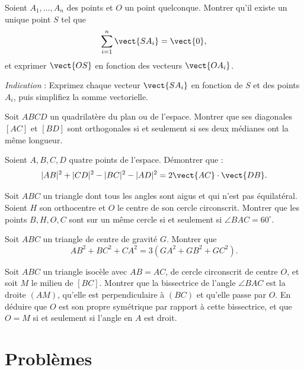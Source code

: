 \begin{exercise}
Soient \( A_1, \ldots, A_n \) des points et \( O \) un point quelconque. Montrer qu'il existe un unique point \( S \) tel que
\[
\sum_{i=1}^{n} \vect{SA_i} = \vect{0},
\]
et exprimer \( \vect{OS} \) en fonction des vecteurs \( \vect{OA_i} \).

\textit{Indication} : Exprimez chaque vecteur \( \vect{SA_i} \) en fonction de \( S \) et des points \( A_i \), puis simplifiez la somme vectorielle.
\end{exercise}

\begin{exercise}
Soit $ABCD$ un quadrilatère du plan ou de l'espace. Montrer que ses diagonales $[AC]$ et $[BD]$ sont orthogonales si et seulement si ses deux médianes ont la même longueur.
\end{exercise}

\begin{exercise}
Soient \( A, B, C, D \) quatre points de l’espace. Démontrer que :
\[
|AB|^2 + |CD|^2 - |BC|^2 - |AD|^2 = 2 \vect{AC} \cdot \vect{DB}.
\]
\end{exercise}

\begin{exercise}
Soit $ABC$ un triangle dont tous les angles sont aigus et qui n'est pas équilatéral. Soient $H$ son orthocentre et $O$ le centre de son cercle circonscrit. Montrer que les points $B, H, O, C$ sont sur un même cercle si et seulement si $\angle BAC = 60^\circ$.
\end{exercise}

\begin{exercise}
Soit $ABC$ un triangle de centre de gravité $G$. Montrer que
\[
AB^2 + BC^2 + CA^2 = 3\left(GA^2 + GB^2 + GC^2\right).
\]
\end{exercise}

\begin{exercise}
Soit $ABC$ un triangle isocèle avec $AB = AC$, de cercle circonscrit de centre $O$, et soit $M$ le milieu de $[BC]$. Montrer que la bissectrice de l'angle $\angle BAC$ est la droite $(AM)$, qu'elle est perpendiculaire à $(BC)$ et qu'elle passe par $O$. En déduire que $O$ est son propre symétrique par rapport à cette bissectrice, et que $O=M$ si et seulement si l'angle en $A$ est droit.
\end{exercise}

\section*{Problèmes}

